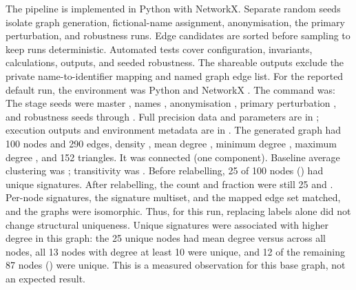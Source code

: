 {}
\markdownRendererSectionEnd 
\markdownRendererSectionEnd \markdownRendererSectionBegin
{}\markdownRendererInterblockSeparator
{}The pipeline is implemented in Python with NetworkX. Separate random seeds isolate graph generation, fictional-name assignment, anonymisation, the primary perturbation, and robustness runs. Edge candidates are sorted before sampling to keep runs deterministic. Automated tests cover configuration, invariants, calculations, outputs, and seeded robustness. The shareable outputs exclude the private name-to-identifier mapping and named graph edge list.\markdownRendererParagraphSeparator
{}For the reported default run, the environment was Python  and NetworkX . The command was:\markdownRendererInterblockSeparator
{}\markdownRendererInterblockSeparator
{}The stage seeds were master , names , anonymisation , primary perturbation , and robustness seeds  through . Full precision data and parameters are in ; execution outputs and environment metadata are in .\markdownRendererInterblockSeparator
{}
\markdownRendererSectionEnd \markdownRendererSectionBegin
{}\markdownRendererInterblockSeparator
{}\markdownRendererSectionBegin
{}\markdownRendererInterblockSeparator
{}The generated graph had 100 nodes and 290 edges, density , mean degree , minimum degree , maximum degree , and 152 triangles. It was connected (one component). Baseline average clustering was ; transitivity was .\markdownRendererInterblockSeparator
{}
\markdownRendererSectionEnd \markdownRendererSectionBegin
{}\markdownRendererInterblockSeparator
{}Before relabelling, 25 of 100 nodes () had unique signatures. After relabelling, the count and fraction were still 25 and . Per-node signatures, the signature multiset, and the mapped edge set matched, and the graphs were isomorphic. Thus, for this run, replacing labels alone did not change structural uniqueness. Unique signatures were associated with higher degree in this graph: the 25 unique nodes had mean degree  versus  across all nodes, all 13 nodes with degree at least 10 were unique, and 12 of the remaining 87 nodes (\markdownRendererCodeSpan{13.8\markdownRendererPercentSign{}}) were unique. This is a measured observation for this base graph, not an expected result.\markdownRendererInterblockSeparator
